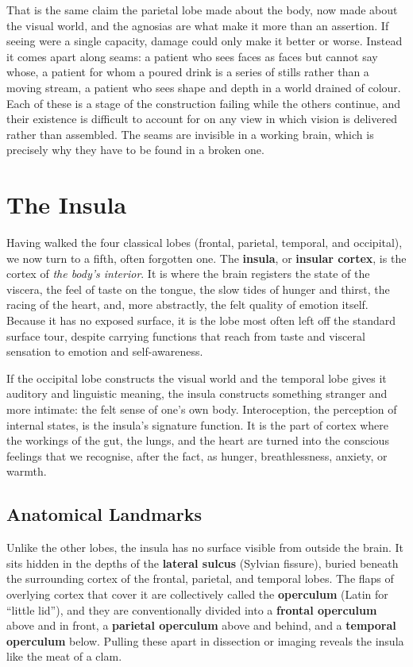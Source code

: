 \documentclass[11pt]{article}
\begin{document}
That is the same claim the parietal lobe made about the body, now made about the visual world, and the agnosias are what make it more than an assertion. If seeing were a single capacity, damage could only make it better or worse. Instead it comes apart along seams: a patient who sees faces as faces but cannot say whose, a patient for whom a poured drink is a series of stills rather than a moving stream, a patient who sees shape and depth in a world drained of colour. Each of these is a stage of the construction failing while the others continue, and their existence is difficult to account for on any view in which vision is delivered rather than assembled. The seams are invisible in a working brain, which is precisely why they have to be found in a broken one.


\section{The Insula}

Having walked the four classical lobes (frontal, parietal, temporal, and occipital), we now turn to a fifth, often forgotten one. The \textbf{insula}, or \textbf{insular cortex}, is the cortex of \textit{the body's interior}. It is where the brain registers the state of the viscera, the feel of taste on the tongue, the slow tides of hunger and thirst, the racing of the heart, and, more abstractly, the felt quality of emotion itself. Because it has no exposed surface, it is the lobe most often left off the standard surface tour, despite carrying functions that reach from taste and visceral sensation to emotion and self-awareness.

If the occipital lobe constructs the visual world and the temporal lobe gives it auditory and linguistic meaning, the insula constructs something stranger and more intimate: the felt sense of one's own body. Interoception, the perception of internal states, is the insula's signature function. It is the part of cortex where the workings of the gut, the lungs, and the heart are turned into the conscious feelings that we recognise, after the fact, as hunger, breathlessness, anxiety, or warmth.

\subsection{Anatomical Landmarks}

Unlike the other lobes, the insula has no surface visible from outside the brain. It sits hidden in the depths of the \textbf{lateral sulcus} (Sylvian fissure), buried beneath the surrounding cortex of the frontal, parietal, and temporal lobes. The flaps of overlying cortex that cover it are collectively called the \textbf{operculum} (Latin for ``little lid''), and they are conventionally divided into a \textbf{frontal operculum} above and in front, a \textbf{parietal operculum} above and behind, and a \textbf{temporal operculum} below. Pulling these apart in dissection or imaging reveals the insula like the meat of a clam.
\end{document}
